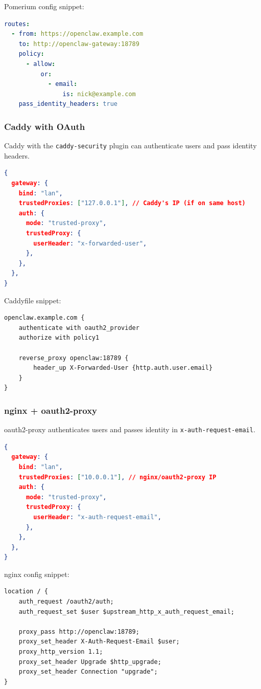 Pomerium config snippet:

\begin{lstlisting}[language=yaml]
routes:
  - from: https://openclaw.example.com
    to: http://openclaw-gateway:18789
    policy:
      - allow:
          or:
            - email:
                is: nick@example.com
    pass_identity_headers: true
\end{lstlisting}


\subsubsection{Caddy with OAuth}


Caddy with the \texttt{caddy-security} plugin can authenticate users and pass identity headers.

\begin{lstlisting}[language=json]
{
  gateway: {
    bind: "lan",
    trustedProxies: ["127.0.0.1"], // Caddy's IP (if on same host)
    auth: {
      mode: "trusted-proxy",
      trustedProxy: {
        userHeader: "x-forwarded-user",
      },
    },
  },
}
\end{lstlisting}


Caddyfile snippet:

\begin{lstlisting}
openclaw.example.com {
    authenticate with oauth2_provider
    authorize with policy1

    reverse_proxy openclaw:18789 {
        header_up X-Forwarded-User {http.auth.user.email}
    }
}
\end{lstlisting}


\subsubsection{nginx + oauth2-proxy}


oauth2-proxy authenticates users and passes identity in \texttt{x-auth-request-email}.

\begin{lstlisting}[language=json]
{
  gateway: {
    bind: "lan",
    trustedProxies: ["10.0.0.1"], // nginx/oauth2-proxy IP
    auth: {
      mode: "trusted-proxy",
      trustedProxy: {
        userHeader: "x-auth-request-email",
      },
    },
  },
}
\end{lstlisting}


nginx config snippet:

\begin{lstlisting}
location / {
    auth_request /oauth2/auth;
    auth_request_set $user $upstream_http_x_auth_request_email;

    proxy_pass http://openclaw:18789;
    proxy_set_header X-Auth-Request-Email $user;
    proxy_http_version 1.1;
    proxy_set_header Upgrade $http_upgrade;
    proxy_set_header Connection "upgrade";
}
\end{lstlisting}


